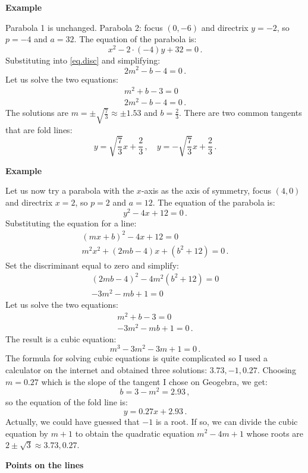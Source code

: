 \documentclass[11pt,a4paper]{article}
\newcommand*{\disfrac}[2]{\displaystyle\frac{#1}{#2}}
\newenvironment{form}[1]{%
\begin{displaymath}%
\renewcommand{\arraystretch}{#1}%
\begin{array}{lcl}}%
{\end{array}%
\end{displaymath}%
}
\begin{document}
\textbf{Example}

Parabola 1 is unchanged. Parabola 2: focus $(0,-6)$ and directrix $y=-2$, so $p=-4$ and $a=32$. The equation of the parabola is:
\[
x^2-2\cdot (-4)y +32=0\,.
\]
Substituting into \ref{eq.disc} and simplifying:
\[
2m^2-b-4=0\,.
\]
Let us solve the two equations:
\begin{form}{1.5}
m^2+b-3=0\\
2m^2-b-4=0\,.
\end{form}
The solutions are $m=\pm\sqrt{\disfrac{7}{3}}\approx \pm 1.53$ and $b=\disfrac{2}{3}$. There are two common tangents that are fold lines:
\[
y=\sqrt{\disfrac{7}{3}}x+\disfrac{2}{3}\,,\quad y=-\sqrt{\disfrac{7}{3}}x+\disfrac{2}{3}\,.
\]


\textbf{Example}

Let us now try a parabola with the $x$-axis as the axis of symmetry, focus $(4,0)$ and directrix $x=2$, so $p=2$ and $a=12$. The equation of the parabola is:
\[
y^2-4x+12 = 0\,.
\]
Substituting the equation for a line:
\begin{form}{1.5}
(mx+b)^2-4x+12=0\\
m^2x^2+(2mb-4)x+(b^2+12)=0\,.
\end{form}
Set the discriminant equal to zero and simplify:
\begin{form}{1.5}
(2mb-4)^2-4m^2(b^2+12)=0\\
-3m^2-mb+1=0
\end{form}
Let us solve the two equations:
\begin{form}{1.5}
m^2+b-3=0\\
-3m^2-mb+1=0\,.
\end{form}
The result is a cubic equation:
\[
m^3-3m^2-3m+1=0\,.
\]
The formula for solving cubic equations is quite complicated so I used a calculator on the internet and obtained three solutions: $3.73, -1, 0.27$. Choosing $m=0.27$ which is the slope of the tangent I chose on Geogebra, we get:
\[
b=3-m^2=2.93\,,
\]
so the equation of the fold line is:
\[
y=0.27x+2.93\,.
\]
Actually, we could have guessed that $-1$ is a root. If so, we can divide the cubic equation by $m+1$ to obtain the quadratic equation $m^2-4m+1$ whose roots are $2\pm\sqrt{3}\approx 3.73, 0.27$.



\textbf{Points on the lines}
\end{document}

